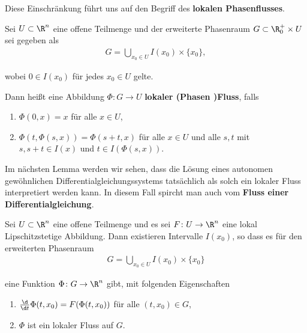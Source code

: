 \documentclass[letterpaper,10pt,english]{jupyterBook}
\begin{document}
\par
Diese Einschränkung führt uns auf den Begriff des \textbf{lokalen Phasenflusses}.
\label{ode/fluesse:def:LokFluss}
\begin{definition}{}{}



\par
Sei \(U \subset \R^n\) eine offene Teilmenge und der erweiterte Phasenraum \(G\subset \R^+_0\times U\) sei gegeben als
\begin{align*}
G = \bigcup_{x_0\in U} I(x_0) \times \{x_0\},
\end{align*}
\par
wobei \(0\in I(x_0)\) für jedes \(x_0\in U\) gelte.

\par
Dann heißt eine Abbildung \(\Phi: G\rightarrow U\) \textbf{lokaler (Phasen )Fluss}, falls
\begin{enumerate}

\item {} 
\par
\(\Phi(0,x) = x\) für alle \(x\in U\),

\item {} 
\par
\(\Phi(t, \Phi(s, x)) = \Phi(s+t, x)\) für alle \(x\in U\) und alle \(s,t\) mit \(s, s+t\in I(x)\) und \(t\in I(\Phi(s,x))\).

\end{enumerate}
\end{definition}

\par
Im nächsten Lemma werden wir sehen, dass die Lösung eines autonomen gewöhnlichen Differentialgleichungssystems tatsächlich als solch ein lokaler Fluss interpretiert werden kann.
In diesem Fall spircht man auch vom \textbf{Fluss einer Differentialgleichung}.
\label{ode/fluesse:lemma-3}
\begin{lemma}{}{}



\par
Sei \(U\subset\R^n\) eine offene Teilmenge und es sei \(F \colon U \rightarrow \R^n\) eine lokal Lipschitzstetige Abbildung.
Dann existieren Intervalle \(I(x_0)\), so dass es für den erweiterten Phasenraum
\begin{align*}
G = \bigcup_{x_0\in U} I(x_0)\times\{x_0\}
\end{align*}
\par
eine Funktion \(\Phi \colon G\rightarrow \R^n\) gibt, mit folgenden Eigenschaften
\begin{enumerate}

\item {} 
\par
\(\frac{\d}{\d t} \Phi(t, x_0) = F(\Phi(t, x_0))\) für alle \((t,x_0)\in G\),

\item {} 
\par
\(\Phi\) ist ein lokaler Fluss auf \(G\).

\end{enumerate}
\end{lemma}
\end{document}
